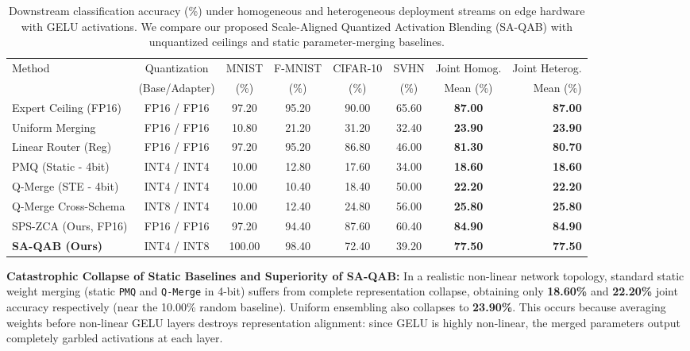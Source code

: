         \begin{table}[t]
        \caption{Downstream classification accuracy (\%) under homogeneous and heterogeneous deployment streams on edge hardware with GELU activations. We compare our proposed Scale-Aligned Quantized Activation Blending (SA-QAB) with unquantized ceilings and static parameter-merging baselines.}
        \label{tab:main_results}
        \vskip 0.05in
\begin{center}
\begin{small}
\begin{sc}
\setlength{\tabcolsep}{4pt}
\begin{tabular}{lccccccr}
\toprule
Method & Quantization & MNIST & F-MNIST & CIFAR-10 & SVHN & Joint Homog. & Joint Heterog. \\
 & (Base/Adapter) & (\%) & (\%) & (\%) & (\%) & Mean (\%) & Mean (\%) \\
\midrule
Expert Ceiling (FP16) & FP16 / FP16 & 97.20 & 95.20 & 90.00 & 65.60 & \textbf{87.00} & \textbf{87.00} \\
Uniform Merging & FP16 / FP16 & 10.80 & 21.20 & 31.20 & 32.40 & \textbf{23.90} & \textbf{23.90} \\
Linear Router (Reg) & FP16 / FP16 & 97.20 & 95.20 & 86.80 & 46.00 & \textbf{81.30} & \textbf{80.70} \\
PMQ (Static - 4bit) & INT4 / INT4 & 10.00 & 12.80 & 17.60 & 34.00 & \textbf{18.60} & \textbf{18.60} \\
\midrule
Q-Merge (STE - 4bit) & INT4 / INT4 & 10.00 & 10.40 & 18.40 & 50.00 & \textbf{22.20} & \textbf{22.20} \\
Q-Merge Cross-Schema & INT8 / INT4 & 10.00 & 12.40 & 24.80 & 56.00 & \textbf{25.80} & \textbf{25.80} \\
SPS-ZCA (Ours, FP16) & FP16 / FP16 & 97.20 & 94.40 & 87.60 & 60.40 & \textbf{84.90} & \textbf{84.90} \\
\midrule
\textbf{SA-QAB (Ours)} & INT4 / INT8 & 100.00 & 98.40 & 72.40 & 39.20 & \textbf{77.50} & \textbf{77.50} \\
\bottomrule
\end{tabular}
\end{sc}
\end{small}
\end{center}
\vskip -0.1in
\end{table}

\textbf{Catastrophic Collapse of Static Baselines and Superiority of SA-QAB:} In a realistic non-linear network topology, standard static weight merging (static \texttt{PMQ} and \texttt{Q-Merge} in 4-bit) suffers from complete representation collapse, obtaining only \textbf{18.60\%} and \textbf{22.20\%} joint accuracy respectively (near the 10.00\% random baseline). Uniform ensembling also collapses to \textbf{23.90\%}. This occurs because averaging weights before non-linear GELU layers destroys representation alignment: since GELU is highly non-linear, the merged parameters output completely garbled activations at each layer.

